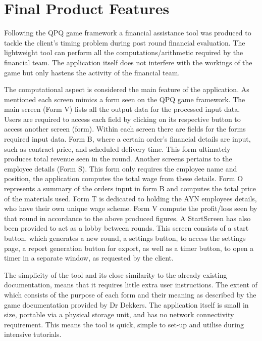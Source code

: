 \documentclass{l3proj}
\begin{document}
\section{Final Product Features}
\label{sec:finalproduct}
Following the QPQ game framework a financial assistance tool was produced to tackle the client's timing problem during post round financial evaluation. The lightweight tool can perform all the computations/arithmetic required by the financial team. The application itself does not interfere with the workings of the game but only hastens the activity of the financial team.

The computational aspect is considered the main feature of the application. As mentioned each screen mimics a form seen on the QPQ game framework. The main screen (Form V) lists all the output data for the processed input data. Users are required to access each field by clicking on its respective button to access another screen (form). Within each screen there are fields for the forms required input data. Form B, where a certain order's financial details are input, such as contract price, and scheduled delivery time. This form ultimately produces total revenue seen in the round. Another screens pertains to the employee details (Form S). This form only requires the employee name and position, the application computes the total wage from these details. Form O represents a summary of the orders input in form B and computes the total price of the materials used. Form T is dedicated to holding the AYN employees details, who have their own unique wage scheme. Form V compute the profit/loss seen by that round in accordance to the above produced figures. A StartScreen has also been provided to act as a lobby between rounds. This screen consists of a start button, which generates a new round, a settings button, to access the settings page, a report generation button for export, as well as a timer button, to open a timer in a separate window, as requested by the client.

The simplicity of the tool and its close similarity to the already existing documentation, means that it requires little extra user instructions. The extent of which consists of the purpose of each form and their meaning as described by the game documentation provided by Dr Dekkers. The application itself is small in size, portable via a physical storage unit, and has no network connectivity requirement. This means the tool is quick, simple to set-up and utilise during intensive tutorials.
\end{document}
